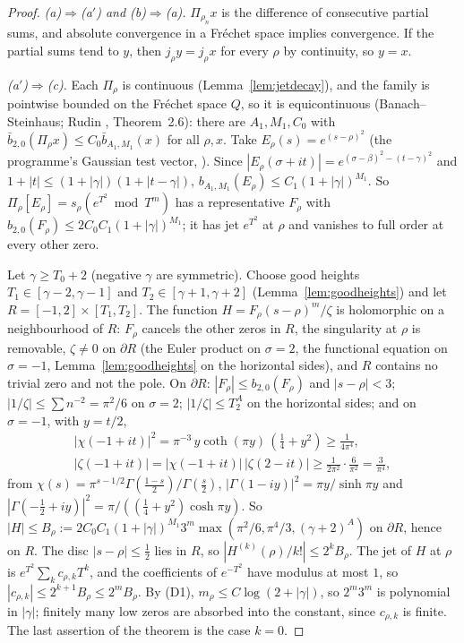 \begin{proof}
\emph{(a)$\Rightarrow$(a$'$) and (b)$\Rightarrow$(a).} $\Pi_{\rho_n}x$ is the difference of consecutive partial sums, and absolute convergence in a Fréchet space implies convergence. If the partial sums tend to $y$, then $j_\rho y=j_\rho x$ for every $\rho$ by continuity, so $y=x$.

\emph{(a$'$)$\Rightarrow$(c).}
Each $\Pi_\rho$ is continuous (Lemma~\ref{lem:jetdecay}), and the family is pointwise bounded on the Fréchet space $Q$, so it is equicontinuous (Banach--Steinhaus; Rudin \cite{Rudin}, Theorem~2.6): there are $A_1,M_1,C_0$ with $\bar b_{2,0}(\Pi_\rho x)\le C_0\bar b_{A_1,M_1}(x)$ for all $\rho,x$.
Take $E_\rho(s)=e^{(s-\rho)^2}$ (the programme's Gaussian test vector, ). Since $|E_\rho(\sigma+it)|=e^{(\sigma-\beta)^2-(t-\gamma)^2}$ and $1+|t|\le(1+|\gamma|)(1+|t-\gamma|)$, $b_{A_1,M_1}(E_\rho)\le C_1(1+|\gamma|)^{M_1}$.
So $\Pi_\rho[E_\rho]=s_\rho(e^{T^2}\bmod T^m)$ has a representative $F_\rho$ with $b_{2,0}(F_\rho)\le2C_0C_1(1+|\gamma|)^{M_1}$; it has jet $e^{T^2}$ at $\rho$ and vanishes to full order at every other zero.

Let $\gamma\ge T_0+2$ (negative $\gamma$ are symmetric). Choose good heights $T_1\in[\gamma-2,\gamma-1]$ and $T_2\in[\gamma+1,\gamma+2]$ (Lemma~\ref{lem:goodheights}) and let $R=[-1,2]\times[T_1,T_2]$.
The function $H=F_\rho(s-\rho)^m/\zeta$ is holomorphic on a neighbourhood of $R$: $F_\rho$ cancels the other zeros in $R$, the singularity at $\rho$ is removable, $\zeta\ne0$ on $\partial R$ (the Euler product on $\sigma=2$, the functional equation on $\sigma=-1$, Lemma~\ref{lem:goodheights} on the horizontal sides), and $R$ contains no trivial zero and not the pole.
On $\partial R$: $|F_\rho|\le b_{2,0}(F_\rho)$ and $|s-\rho|<3$; $|1/\zeta|\le\sum n^{-2}=\pi^2/6$ on $\sigma=2$; $|1/\zeta|\le T_2^A$ on the horizontal sides; and on $\sigma=-1$, with $y=t/2$,
\begin{gather*}
|\chi(-1+it)|^2=\pi^{-3}\,y\coth(\pi y)\,(\tfrac14+y^2)\ge\frac1{4\pi^4},\\
|\zeta(-1+it)|=|\chi(-1+it)|\,|\zeta(2-it)|\ge\frac1{2\pi^2}\cdot\frac6{\pi^2}=\frac3{\pi^4},
\end{gather*}
from $\chi(s)=\pi^{s-1/2}\Gamma(\tfrac{1-s}2)/\Gamma(\tfrac s2)$, $|\Gamma(1-iy)|^2=\pi y/\sinh\pi y$ and $|\Gamma(-\tfrac12+iy)|^2=\pi/((\tfrac14+y^2)\cosh\pi y)$.
So $|H|\le B_\rho:=2C_0C_1(1+|\gamma|)^{M_1}3^m\max(\pi^2/6,\pi^4/3,(\gamma+2)^A)$ on $\partial R$, hence on $R$.
The disc $|s-\rho|\le\tfrac12$ lies in $R$, so $|H^{(k)}(\rho)/k!|\le2^kB_\rho$. The jet of $H$ at $\rho$ is $e^{T^2}\sum_kc_{\rho,k}T^k$, and the coefficients of $e^{-T^2}$ have modulus at most $1$, so $|c_{\rho,k}|\le2^{k+1}B_\rho\le2^mB_\rho$.
By (D1), $m_\rho\le C\log(2+|\gamma|)$, so $2^m3^m$ is polynomial in $|\gamma|$; finitely many low zeros are absorbed into the constant, since $c_{\rho,k}$ is finite. The last assertion of the theorem is the case $k=0$.


\end{proof}
